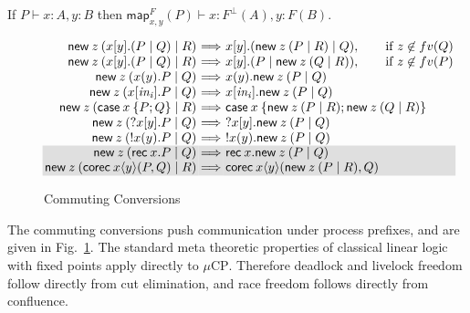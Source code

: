 \documentclass[orivec,envcountsame]{llncs}
\makeatletter
\newcommand{\cpdual}[1]{#1^\perp}
\newcommand{\cptyp}[2]{#1 \vdash #2}
\newcommand{\mapname}{\mathsf{map}}
\newcommand{\map}[3]{\mapname^{#1}_{#2}(#3)}
\newcommand{\mkwd}[1]{\mathsf{#1}}
\newcommand{\cut}[4]{\mkwd{new}\:#1 \: (#3 \mid #4)}
\newcommand{\replicate}[2]{{!#1(#2)}}
\newcommand{\derelict}[2]{{?#1[#2]}}
\newcommand{\rec}[1]{\mkwd{rec}\:#1}
\newcommand{\corec}[4]{\mkwd{corec}\:{#1} \langle #2 \rangle (#3,#4)}
\newcommand{\clabel}[1]{\mathit{#1}}
\renewcommand{\case}[2]{\mkwd{case}\:#1\:\{#2\}}
\newcommand{\sel}[2]{#1[\clabel{#2}]}
\newcommand{\mucp}{$\mu\mathrm{CP}$\xspace}
\newcommand{\ba}{\begin{array}}
\newcommand{\ea}{\end{array}}
\newenvironment{equations}{\[\ba{@{}r@{~}c@{~}l@{}}}{\ea\]}
\newcommand\shaderow{\noalign{\vskip-0.4pt}\rowcolor{shade}[0.6mm]}
\makeatother
\begin{document}
\begin{lemma}
  If $\cptyp{P}{x:A,y:B}$ then \(\cptyp{\map{F}{x,y}{P}}{x:\cpdual{F}(A),y:F(B)}.\)
\end{lemma}

\begin{figure}[float]
\small
\begin{equations}
  \cut{z}{A}{x[y].(P \mid Q)}{R} &\Longrightarrow& x[y].(\cut{z}{A}{P}{R} \mid Q), \qquad \text{if $z \not\in fv(Q)$} \\
  \cut{z}{A}{x[y].(P \mid Q)}{R} &\Longrightarrow& x[y].(P \mid \cut{z}{A}{Q}{R}), \qquad \text{if $z \not\in fv(P)$} \\
  \cut{z}{A}{x(y).P}{Q} &\Longrightarrow& x(y).\cut{z}{A}{P}{Q} \\
  \cut{z}{A}{\sel{x}{in_i}.P}{Q} &\Longrightarrow& \sel{x}{in_i}.\cut{z}{A}{P}{Q} \\
  \cut{z}{A}{\case{x}{P;Q}}{R} &\Longrightarrow& \case{x}{\cut{z}{A}{P}{R}; \cut{z}{A}{Q}{R}} \\
  \cut{z}{} {\derelict{x}{y}.P}{Q} &\Longrightarrow& \derelict{x}{y}.\cut{z}{}{P}{Q} \\
  \cut{z}{} {\replicate{x}{y}.P}{Q} &\Longrightarrow& \replicate{x}{y}.\cut{z}{}{P}{Q} \\ \shaderow
  \cut{z}{A}{\rec{x}.P}{Q} &\Longrightarrow& \rec{x}.\cut{z}{A}{P}{Q} \\ \shaderow
  \cut{z}{A}{\corec{x}{y}{P}{Q}}{R} &\Longrightarrow& \corec{x}{y}{\cut{z}{A}{P}{R}}{Q} \\
\end{equations}
\caption{Commuting Conversions}\label{fig:commuting}
\end{figure}

The commuting conversions push communication under process prefixes, and are given in
Fig.~\ref{fig:commuting}.
%
The standard meta theoretic properties of classical linear logic with fixed points apply directly to
\mucp. Therefore deadlock and livelock freedom follow directly from cut elimination, and race
freedom follows directly from confluence.




\end{document}
